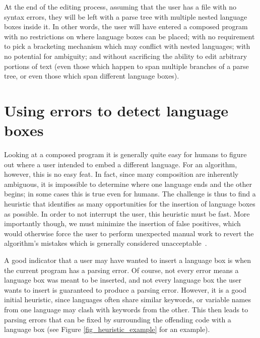 \documentclass[sigplan,screen]{acmart}\settopmatter{printfolios=true,printccs=false,printacmref=false}
\begin{document}
At the end of the editing process, assuming that the user has a file with no syntax
errors, they will be left with a parse tree with multiple nested language boxes inside
it. In other words, the user will have entered a
composed program with no restrictions on where language boxes can be placed; with no
requirement to pick a bracketing mechanism which may conflict with nested
languages; with no potential for ambiguity; and without sacrificing the ability
to edit arbitrary portions of text (even those which happen to span multiple
branches of a parse tree, or even those which span different language boxes).

\section{Using errors to detect language boxes}
\label{sec_finding_lbox_candidates}

Looking at a composed program it is generally quite easy for humans
to figure out where a user intended to embed a different
language. For an algorithm, however, this is no easy feat. In fact, since
many composition are inherently ambiguous, it is impossible to determine
where one language ends and the other begins; in some cases this is true
even for humans. The challenge is thus to find a heuristic that identifies as many
opportunities for the insertion of language boxes as possible. In order to not
interrupt the user, this heuristic must be fast. More importantly though, we
must minimize the insertion of false positives, which would otherwise force the
user to perform unexpected manual work to revert the algorithm's mistakes which
is generally considered
unacceptable~\cite{vanter00displaying,lewis95designing,vanter94practical}.

A good indicator that a user may have wanted to insert a language box is when
the current program has a parsing error. Of course, not every error means a
language box was meant to be inserted, and not every language box the user
wants to insert is guaranteed to produce a parsing error. However, it is a good
initial heuristic, since languages often share similar keywords, or variable
names from one language may clash with keywords from the other.  This then
leads to parsing errors that can be fixed by surrounding the offending code
with a language box (see Figure \ref{fig_heuristic_example} for an example).
\end{document}
